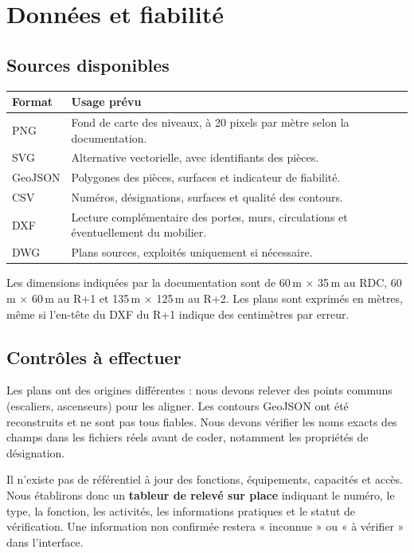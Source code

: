 \documentclass[11pt,a4paper]{article}
\begin{document}
\section{Données et fiabilité}
\subsection{Sources disponibles}
\begin{longtable}{p{}p{}}
\toprule Format & Usage prévu \\ \midrule
PNG & Fond de carte des niveaux, à 20 pixels par mètre selon la documentation.\\
SVG & Alternative vectorielle, avec identifiants des pièces.\\
GeoJSON & Polygones des pièces, surfaces et indicateur de fiabilité.\\
CSV & Numéros, désignations, surfaces et qualité des contours.\\
DXF & Lecture complémentaire des portes, murs, circulations et éventuellement du mobilier.\\
DWG & Plans sources, exploités uniquement si nécessaire.\\
\bottomrule
\end{longtable}
Les dimensions indiquées par la documentation sont de 60\,m $\times$ 35\,m au RDC, 60\,m $\times$ 60\,m au R+1 et 135\,m $\times$ 125\,m au R+2. Les plans sont exprimés en mètres, même si l'en-tête du DXF du R+1 indique des centimètres par erreur.

\subsection{Contrôles à effectuer}
Les plans ont des origines différentes : nous devons relever des points communs (escaliers, ascenseurs) pour les aligner. Les contours GeoJSON ont été reconstruits et ne sont pas tous fiables. Nous devons vérifier les noms exacts des champs dans les fichiers réels avant de coder, notamment les propriétés de désignation.

Il n'existe pas de référentiel à jour des fonctions, équipements, capacités et accès. Nous établirons donc un \textbf{tableur de relevé sur place} indiquant le numéro, le type, la fonction, les activités, les informations pratiques et le statut de vérification. Une information non confirmée restera « inconnue » ou « à vérifier » dans l'interface.
\end{document}
